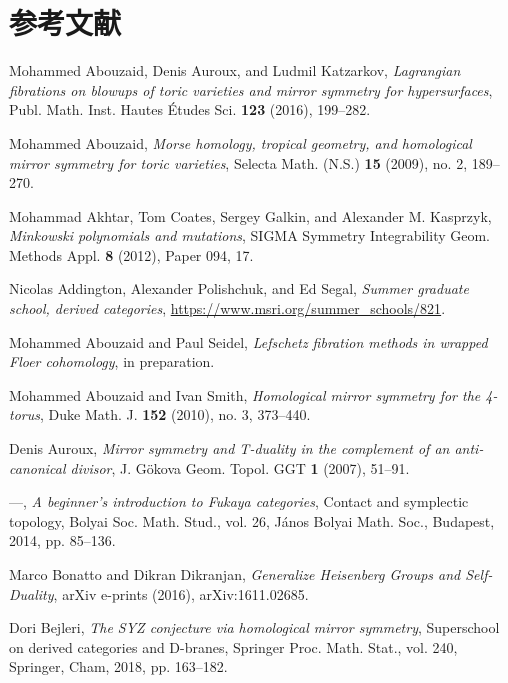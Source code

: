 \section*{参考文献}

\begingroup
\small
\begin{description}[leftmargin=7.4em, labelwidth=6.8em, labelsep=0.6em,
                   font=\normalfont, itemsep=0.35em, parsep=0pt]

\item[{[AAK16]}] Mohammed Abouzaid, Denis Auroux, and Ludmil Katzarkov, \emph{Lagrangian fibrations on blowups of toric varieties and mirror symmetry for hypersurfaces}, Publ. Math. Inst. Hautes \'Etudes Sci. \textbf{123} (2016), 199--282.
\item[{[Abo09]}] Mohammed Abouzaid, \emph{Morse homology, tropical geometry, and homological mirror symmetry for toric varieties}, Selecta Math. (N.S.) \textbf{15} (2009), no. 2, 189--270.
\item[{[ACGK12]}] Mohammad Akhtar, Tom Coates, Sergey Galkin, and Alexander M. Kasprzyk, \emph{Minkowski polynomials and mutations}, SIGMA Symmetry Integrability Geom. Methods Appl. \textbf{8} (2012), Paper 094, 17.
\item[{[APS]}] Nicolas Addington, Alexander Polishchuk, and Ed Segal, \emph{Summer graduate school, derived categories}, \url{https://www.msri.org/summer_schools/821}.
\item[{[AS]}] Mohammed Abouzaid and Paul Seidel, \emph{Lefschetz fibration methods in wrapped Floer cohomology}, in preparation.
\item[{[AS10]}] Mohammed Abouzaid and Ivan Smith, \emph{Homological mirror symmetry for the 4-torus}, Duke Math. J. \textbf{152} (2010), no. 3, 373--440.
\item[{[Aur07]}] Denis Auroux, \emph{Mirror symmetry and T-duality in the complement of an anti-canonical divisor}, J. G\"okova Geom. Topol. GGT \textbf{1} (2007), 51--91.
\item[{[Aur14]}] ---, \emph{A beginner's introduction to Fukaya categories}, Contact and symplectic topology, Bolyai Soc. Math. Stud., vol. 26, J\'anos Bolyai Math. Soc., Budapest, 2014, pp. 85--136.
\item[{[BD16]}] Marco Bonatto and Dikran Dikranjan, \emph{Generalize Heisenberg Groups and Self-Duality}, arXiv e-prints (2016), arXiv:1611.02685.
\item[{[Bej18]}] Dori Bejleri, \emph{The SYZ conjecture via homological mirror symmetry}, Superschool on derived categories and D-branes, Springer Proc. Math. Stat., vol. 240, Springer, Cham, 2018, pp. 163--182.


\end{description}
